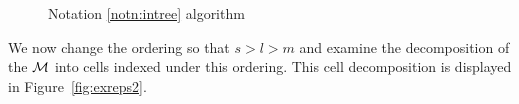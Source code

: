 \documentclass{amsart}
\theoremstyle{definition}
\begin{document}
\begin{figure}[H]
{%
}
\caption{Notation \ref{notn:intree} algorithm}\label{fig:delcontra}
\end{figure}

We now change the ordering so that $s>l>m$ and examine the decomposition of the $\mathcal{M}$ into cells indexed under this ordering.
This cell decomposition is displayed in Figure~\ref{fig:exreps2}.
\end{document}

